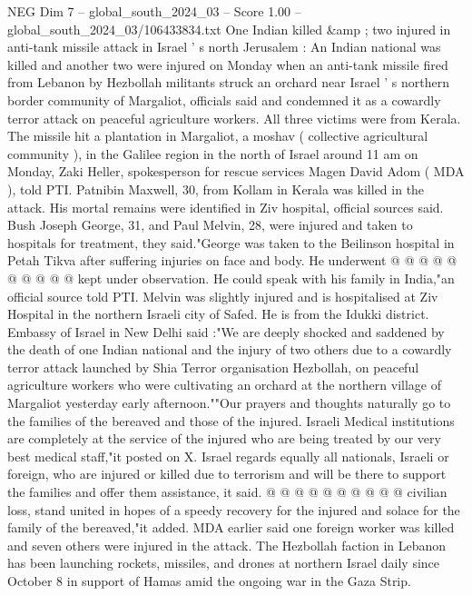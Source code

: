 \begin{textsample}{NEG Dim 7 – global\_south\_2024\_03 – Score 1.00 – global\_south\_2024\_03/106433834.txt}  \label{ex:f7_neg_297}
One Indian killed \&amp ; two injured in anti-tank missile attack in Israel ' s north Jerusalem : An Indian national was killed and another two were injured on Monday when an anti-tank missile fired from Lebanon by Hezbollah militants struck an orchard near Israel ' s northern border community of Margaliot, officials said and condemned it as a cowardly terror attack on peaceful agriculture workers.
All three victims were from Kerala.
The missile hit a plantation in Margaliot, a moshav ( collective agricultural community ), in the Galilee region in the north of Israel around 11 am on Monday, Zaki Heller, spokesperson for rescue services Magen David Adom ( MDA ), told PTI.
Patnibin Maxwell, 30, from Kollam in Kerala was killed in the attack.
His mortal remains were identified in Ziv hospital, official sources said.
Bush Joseph George, 31, and Paul Melvin, 28, were injured and taken to hospitals for treatment, they said."George was taken to the Beilinson hospital in Petah Tikva after suffering injuries on face and body.
He underwent @ @ @ @ @ @ @ @ @ @ kept under observation.
He could speak with his family in India,"an official source told PTI.
Melvin was slightly injured and is hospitalised at Ziv Hospital in the northern Israeli city of Safed.
He is from the Idukki district.
Embassy of Israel in New Delhi said :"We are deeply shocked and saddened by the death of one Indian national and the injury of two others due to a cowardly terror attack launched by Shia Terror organisation Hezbollah, on peaceful agriculture workers who were cultivating an orchard at the northern village of Margaliot yesterday early afternoon.""Our prayers and thoughts naturally go to the families of the bereaved and those of the injured.
Israeli Medical institutions are completely at the service of the injured who are being treated by our very best medical staff,"it posted on X.
Israel regards equally all nationals, Israeli or foreign, who are injured or killed due to terrorism and will be there to support the families and offer them assistance, it said. @ @ @ @ @ @ @ @ @ @ civilian loss, stand united in hopes of a speedy recovery for the injured and solace for the family of the bereaved,"it added.
MDA earlier said one foreign worker was killed and seven others were injured in the attack.
The Hezbollah faction in Lebanon has been launching rockets, missiles, and drones at northern Israel daily since October 8 in support of Hamas amid the ongoing war in the Gaza Strip.

\end{textsample}
